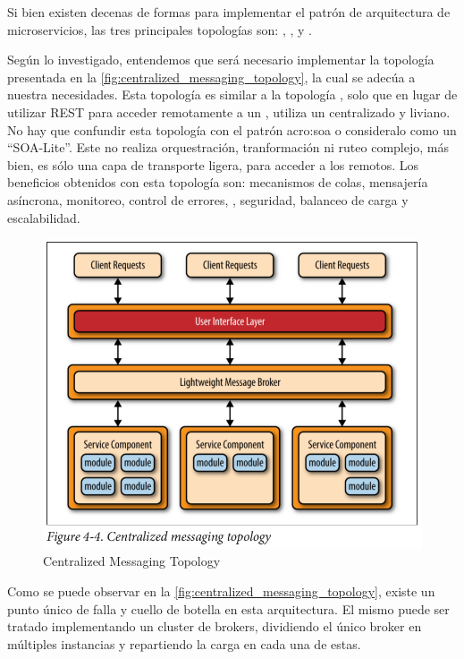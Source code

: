 Si bien existen decenas de formas para implementar el patrón de arquitectura de microservicios, las tres principales topologías son: , , y .

Según lo investigado, entendemos que será necesario implementar la topología  presentada en la \autoref{fig:centralized_messaging_topology}, la cual se adecúa a nuestra necesidades.  Esta topología es similar a la topología , solo que en lugar de utilizar REST para acceder remotamente a un , utiliza un  centralizado y liviano.  No hay que confundir esta topología con el patrón \gls{acro:soa} o consideralo como un ``SOA-Lite''.  Este  no realiza orquestración, tranformación ni ruteo complejo, más bien, es sólo una capa de transporte ligera, para acceder a los  remotos.  Los beneficios obtenidos con esta topología son: mecanismos de colas, mensajería asíncrona, monitoreo, control de errores, , seguridad, balanceo de carga y escalabilidad.

\begin{figure}[H]
  \includegraphics[width=\linewidth]{src/images/02-capitulo-2/centralized_messaging_topology.png}
  \caption{Centralized Messaging Topology}
  \label{fig:centralized_messaging_topology}
\end{figure}

Como se puede observar en la \autoref{fig:centralized_messaging_topology}, existe un punto único de falla y cuello de botella en esta arquitectura. El mismo puede ser tratado implementando un cluster de brokers, dividiendo el único broker en múltiples instancias y repartiendo la carga en cada una de estas.\cite[p.~31]{richards2015}

